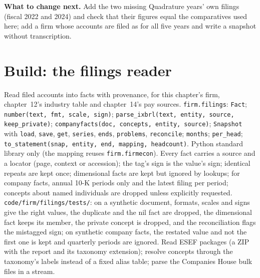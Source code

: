 \textbf{What to change next.} Add the two missing Quadrature years' own filings (fiscal 2022 and 2024) and check that
their figures equal the comparatives used here; add a firm whose accounts are filed as  for all five years
and write a snapshot without transcription.

\section{Build: the filings reader}\label{bld:in:reading-a-trading-firms-accounts:filings}

\begin{build}
 Read filed accounts into facts with provenance, for this chapter's firm, chapter~12's industry table
and chapter~14's pay sources.
 \texttt{firm.filings}: \texttt{Fact}; \texttt{number(text, fmt, scale, sign)};
\texttt{parse\_ixbrl(text, entity, source, keep\_private)}; \texttt{companyfacts(doc, concepts, entity, source)};
\texttt{Snapshot} with \texttt{load}, \texttt{save}, \texttt{get}, \texttt{series}, \texttt{ends}, \texttt{problems},
\texttt{reconcile}; \texttt{months}; \texttt{per\_head}; \texttt{to\_statement(snap, entity, end, mapping, headcount)}.
Python standard library only (the mapping reuses \texttt{firm.firmecon}).
 Every fact carries a source and a locator (page, context or accession); the tag's sign is the value's
sign; identical repeats are kept once; dimensional facts are kept but ignored by lookups; for company facts, annual
10-K periods only and the latest filing per period; concepts about named individuals are dropped unless explicitly
requested.
 \texttt{code/firm/filings/tests/}: on a synthetic document, formats, scales and signs give
the right values, the duplicate and the nil fact are dropped, the dimensional fact keeps its member, the private
concept is dropped, and the reconciliation flags the mistagged sign; on synthetic company facts, the restated value
and not the first one is kept and quarterly periods are ignored.
 Read ESEF packages (a ZIP with the report and its taxonomy extension); resolve concepts through the
taxonomy's labels instead of a fixed alias table; parse the Companies House bulk files in a stream.
\end{build}

